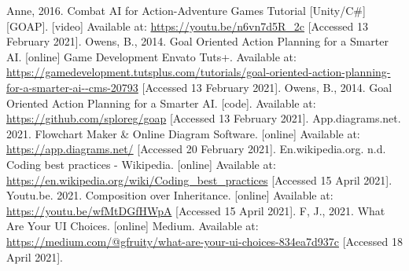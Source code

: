 \documentclass[12pt]{report}
\begin{document}
\begin{thebibliography}{}
    Anne, 2016. Combat AI for Action-Adventure Games Tutorial [Unity/C\#] [GOAP]. [video] Available at: \url{https://youtu.be/n6vn7d5R_2c} [Accessed 13 February 2021].
    Owens, B., 2014. Goal Oriented Action Planning for a Smarter AI. [online] Game Development Envato Tuts+. Available at: \url{https://gamedevelopment.tutsplus.com/tutorials/goal-oriented-action-planning-for-a-smarter-ai--cms-20793} [Accessed 13 February 2021].
    Owens, B., 2014. Goal Oriented Action Planning for a Smarter AI. [code]. Available at: \url{https://github.com/sploreg/goap} [Accessed 13 February 2021].
    App.diagrams.net. 2021. Flowchart Maker \& Online Diagram Software. [online] Available at: \url{https://app.diagrams.net/} [Accessed 20 February 2021].
    En.wikipedia.org. n.d. Coding best practices - Wikipedia. [online] Available at: \url{https://en.wikipedia.org/wiki/Coding_best_practices} [Accessed 15 April 2021].
    Youtu.be. 2021. Composition over Inheritance. [online] Available at: \url{https://youtu.be/wfMtDGfHWpA} [Accessed 15 April 2021].
    F, J., 2021. What Are Your UI Choices. [online] Medium. Available at: \url{https://medium.com/@gfruity/what-are-your-ui-choices-834ea7d937c} [Accessed 18 April 2021].
\end{thebibliography}
\end{document}
